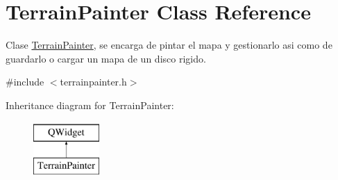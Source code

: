 \hypertarget{class_terrain_painter}{\section{Terrain\-Painter Class Reference}
\label{class_terrain_painter}
}


Clase \hyperlink{class_terrain_painter}{Terrain\-Painter}, se encarga de pintar el mapa y gestionarlo asi como de guardarlo o cargar un mapa de un disco rigido.  




{\ttfamily \#include $<$terrainpainter.\-h$>$}

Inheritance diagram for Terrain\-Painter\-:\begin{figure}[H]
\begin{center}
\leavevmode
\includegraphics[height=2.000000cm]{class_terrain_painter}
\end{center}
\end{figure}
